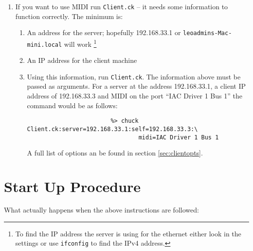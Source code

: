 \documentclass[11pt]{article}
\begin{document}
\begin{enumerate} [\bf 1.]
\begin{enumerate} [\bf i.]
		\item {If you want to use MIDI run \texttt{Client.ck} -- it needs some information to function correctly.
			  The minimum is: }
		\begin{enumerate} [\bf a.]
			\item{An address for the server; hopefully 192.168.33.1 or \texttt{leoadmins-Mac-mini.local} will work
			\footnote{ To find the IP address the server is using for the ethernet either look in the settings or use \verb+ifconfig+
			to find the IPv4 address.}}
			\item{An IP address for the client machine}
			\item Using this information, run \texttt{Client.ck}. The information above must be passed as arguments. For a server at the address 
				192.168.33.1, a client IP address of 192.168.33.3 and MIDI on the port ``IAC Driver 1 Bus 1'' the command would be as follows:
				\begin{verbatim}
					    %> chuck Client.ck:server=192.168.33.1:self=192.168.33.3:\
					            midi=IAC Driver 1 Bus 1
				\end{verbatim}
				A full list of options an be found in section \ref{sec:clientopts}.
		\end{enumerate}
	\end{enumerate}

\end{enumerate}

\newpage
\section{Start Up Procedure}
\label{sec:startupproc}
What actually happens when the above instructions are followed:
\end{document}
